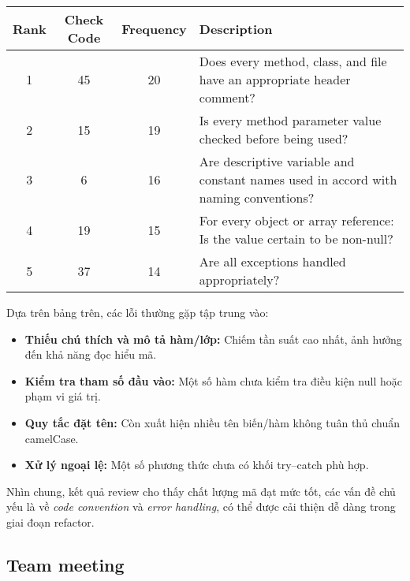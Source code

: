 \begin{longtable}{|c|c|c|p{9cm}|}
\hline
\textbf{Rank} & \textbf{Check Code} & \textbf{Frequency} & \textbf{Description} \\
\hline
1 & 45 & 20 & Does every method, class, and file have an appropriate header comment? \\
\hline
2 & 15 & 19 & Is every method parameter value checked before being used? \\
\hline
3 & 6 & 16 & Are descriptive variable and constant names used in accord with naming conventions? \\
\hline
4 & 19 & 15 & For every object or array reference: Is the value certain to be non-null? \\
\hline
5 & 37 & 14 & Are all exceptions handled appropriately? \\
\hline
\end{longtable}

\noindent
Dựa trên bảng trên, các lỗi thường gặp tập trung vào:
\begin{itemize}
    \item \textbf{Thiếu chú thích và mô tả hàm/lớp:} Chiếm tần suất cao nhất, ảnh hưởng đến khả năng đọc hiểu mã.
    \item \textbf{Kiểm tra tham số đầu vào:} Một số hàm chưa kiểm tra điều kiện null hoặc phạm vi giá trị.
    \item \textbf{Quy tắc đặt tên:} Còn xuất hiện nhiều tên biến/hàm không tuân thủ chuẩn camelCase.
    \item \textbf{Xử lý ngoại lệ:} Một số phương thức chưa có khối try–catch phù hợp.
\end{itemize}

Nhìn chung, kết quả review cho thấy chất lượng mã đạt mức tốt, các vấn đề chủ yếu là về \textit{code convention} và \textit{error handling}, có thể được cải thiện dễ dàng trong giai đoạn refactor.

\subsection{Team meeting}
\centering{}\\[0.5cm]
\centering{}\\[0.5cm]
\centering{}\\[0.5cm]
